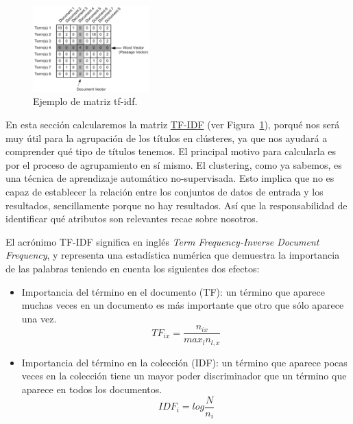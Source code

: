 \documentclass{uimppracticas}
\begin{document}
\begin{figure}
	\centering
	\includegraphics[width=0.4\textwidth]{images/matrix}
	\caption{Ejemplo de matriz tf-idf.}
	\label{matrix}
\end{figure}

En esta sección calcularemos la matriz \href{https://es.wikipedia.org/wiki/Tf-idf}{TF-IDF} (ver Figura~\ref{matrix}), porqué nos será muy útil para la agrupación de los títulos en clústeres, ya que nos ayudará a comprender qué tipo de títulos tenemos. El principal motivo para calcularla es por el proceso de agrupamiento en sí mismo. El clustering, como ya sabemos, es una técnica de aprendizaje automático no-supervisada. Esto implica que no es capaz de establecer la relación entre los conjuntos de datos de entrada y los resultados, sencillamente porque no hay resultados. Así que la responsabilidad de identificar qué atributos son relevantes recae sobre nosotros. 

El acrónimo TF-IDF significa en inglés \textit{Term Frequency-Inverse Document Frequency}, y representa una estadística numérica que demuestra la importancia de las palabras teniendo en cuenta los siguientes dos efectos:

\begin{itemize}
	\item Importancia del término en el documento (TF): un término que aparece muchas veces en un documento
	es más importante que otro que sólo aparece una vez.
	\begin{equation}
		TF_{ix} = \frac{n_{ix}}{max_{l} n_{l,x}}
	\end{equation}
	
	\item Importancia del término en la colección (IDF): un término que aparece pocas veces en la colección
	tiene un mayor poder discriminador que un término que aparece en todos los documentos.
	\begin{equation}
		IDF_i = log \frac{N}{n_{i}}
	\end{equation}
\end{itemize}
\end{document}
